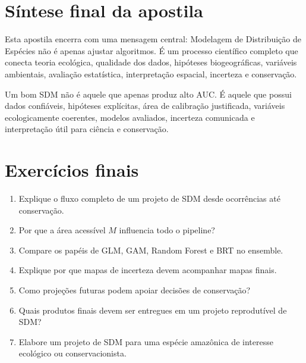 \section{Síntese final da apostila}

Esta apostila encerra com uma mensagem central: Modelagem de Distribuição de Espécies não é apenas ajustar algoritmos. É um processo científico completo que conecta teoria ecológica, qualidade dos dados, hipóteses biogeográficas, variáveis ambientais, avaliação estatística, interpretação espacial, incerteza e conservação.

\begin{conceito}[title={\faBook\quad Mensagem final}]
	Um bom SDM não é aquele que apenas produz alto AUC. É aquele que possui dados confiáveis, hipóteses explícitas, área de calibração justificada, variáveis ecologicamente coerentes, modelos avaliados, incerteza comunicada e interpretação útil para ciência e conservação.
\end{conceito}

\section{Exercícios finais}

\begin{enumerate}
	\item Explique o fluxo completo de um projeto de SDM desde ocorrências até conservação.
	\item Por que a área acessível \(M\) influencia todo o pipeline?
	\item Compare os papéis de GLM, GAM, Random Forest e BRT no ensemble.
	\item Explique por que mapas de incerteza devem acompanhar mapas finais.
	\item Como projeções futuras podem apoiar decisões de conservação?
	\item Quais produtos finais devem ser entregues em um projeto reprodutível de SDM?
	\item Elabore um projeto de SDM para uma espécie amazônica de interesse ecológico ou conservacionista.
\end{enumerate}


